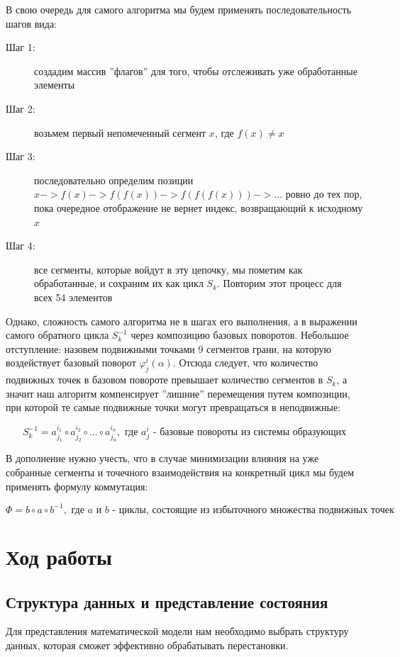 \documentclass{article}
\begin{document}
В свою очередь для самого алгоритма мы будем применять последовательность шагов вида:

\begin{description}
\item[Шаг 1:] создадим массив ''флагов'' для того, чтобы отслеживать уже обработанные элементы
\item[Шаг 2:] возьмем первый непомеченный сегмент $x$, где $f(x)\neq x$
\item[Шаг 3:] последовательно определим позиции $x -> f(x) -> f(f(x)) -> f(f(f(x))) -> \dots$ ровно до тех пор, пока очередное отображение не вернет индекс, возвращающий к исходному $x$
\item[Шаг 4:] все сегменты, которые войдут в эту цепочку, мы пометим как обработанные, и сохраним их как цикл $S_k$. Повторим этот процесс для всех 54 элементов
\end{description}

Однако, сложность самого алгоритма не в шагах его выполнения, а в выражении самого обратного цикла $S_k^{-1}$ через композицию базовых поворотов. Небольшое отступление: назовем подвижными точками 9 сегментов грани, на которую воздействует базовый поворот $\varphi_{j}^{i}(\alpha)$. Отсюда следует, что количество подвижных точек в базовом повороте превышает количество сегментов в $S_k$, а значит наш алгоритм компенсирует ''лишние'' перемещения путем композиции, при которой те самые подвижные точки могут превращаться в неподвижные:

\begin{equation}
S_k^{-1} = a_{j_1}^{i_1}\circ a_{j_2}^{i_2}\circ\dots\circ a_{j_n}^{i_n},\text{ где $a_{j}^{i}$ - базовые повороты из системы образующих}
\end{equation}

В дополнение нужно учесть, что в случае минимизации влияния на уже собранные сегменты и точечного взаимодействия на конкретный цикл мы будем применять формулу коммутация:

\begin{equation}
\Phi = b\circ a\circ b^{-1}, \text{ где $a$ и $b$ - циклы, состоящие из избыточного множества подвижных точек}
\end{equation}

\section{Ход работы}
\subsection{Структура данных и представление состояния}
Для представления математической модели нам необходимо выбрать структуру данных, которая сможет эффективно обрабатывать перестановки. 
\end{document}
